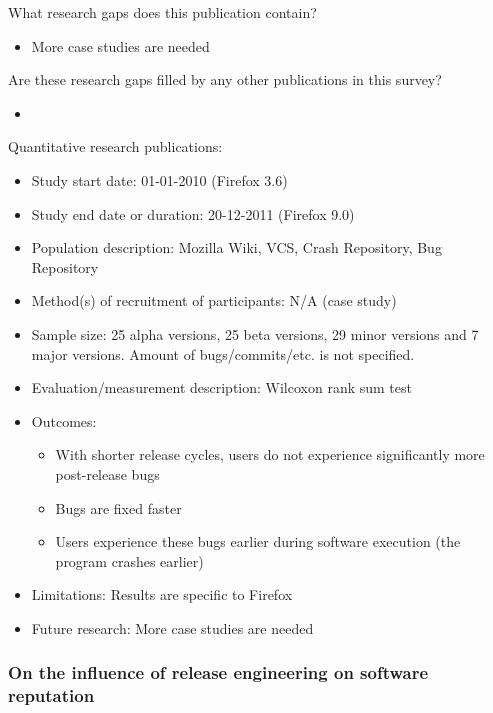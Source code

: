 \documentclass[]{book}
\providecommand{\tightlist}{%
  \setlength{\itemsep}{0pt}\setlength{\parskip}{0pt}}
\begin{document}
What research gaps does this publication contain?

\begin{itemize}
\tightlist
\item
  More case studies are needed
\end{itemize}

Are these research gaps filled by any other publications in this survey?

\begin{itemize}
\item
\end{itemize}

Quantitative research publications:

\begin{itemize}
\tightlist
\item
  Study start date: 01-01-2010 (Firefox 3.6)
\item
  Study end date or duration: 20-12-2011 (Firefox 9.0)
\item
  Population description: Mozilla Wiki, VCS, Crash Repository, Bug
  Repository
\item
  Method(s) of recruitment of participants: N/A (case study)
\item
  Sample size: 25 alpha versions, 25 beta versions, 29 minor versions
  and 7 major versions. Amount of bugs/commits/etc. is not specified.
\item
  Evaluation/measurement description: Wilcoxon rank sum test
\item
  Outcomes:

  \begin{itemize}
  \tightlist
  \item
    With shorter release cycles, users do not experience significantly
    more post-release bugs
  \item
    Bugs are fixed faster
  \item
    Users experience these bugs earlier during software execution (the
    program crashes earlier)
  \end{itemize}
\item
  Limitations: Results are specific to Firefox
\item
  Future research: More case studies are needed
\end{itemize}

\subsubsection{On the influence of release engineering on software
reputation}\label{on-the-influence-of-release-engineering-on-software-reputation}
\end{document}
